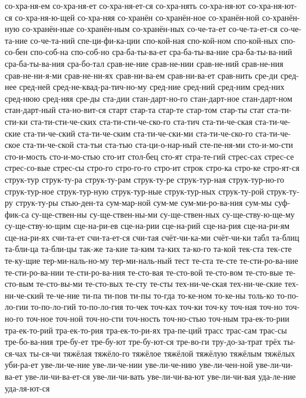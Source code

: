 {со-хра-ня-ем
со-хра-ня-ет
со-хра-ня-ет-ся
со-хра-нять
со-хра-ня-ют
со-хра-ня-ют-ся
со-хра-ня-ю-щей
со-хра-няя
со-хранён
со-хранён-ное
со-хранён-ной
со-хранён-ную
со-хранён-ные
со-хранён-ным
со-хранён-ных
со-че-та-ет
со-че-та-ет-ся
со-че-та-ние
со-че-та-ний
спе-ци-фи-ка-ции
спо-кой-ная
спо-кой-ном
спо-кой-ных
спо-со-бен
спо-соб-на
спо-соб-но
сра-ба-ты-ва-ет
сра-ба-ты-ва-ние
сра-ба-ты-ва-ний
сра-ба-ты-ва-ния
сра-бо-тал
срав-не-ние
срав-не-нии
срав-не-ний
срав-не-ния
срав-не-ни-я-ми
срав-не-ни-ях
срав-ни-ва-ем
срав-ни-ва-ет
срав-нить
сре-ди
сред-нее
сред-ней
сред-не-квад-ра-тич-но-му
сред-ние
сред-ний
сред-ним
сред-них
сред-нюю
сред-няя
сре-ды
ста-дии
стан-дарт-но-го
стан-дарт-ное
стан-дарт-ном
стан-дарт-ный
ста-но-вит-ся
старт
стар-та
стар-те
стар-том
стар-ты
стат
ста-ти-сти-ки
ста-ти-сти-че-ских
ста-ти-сти-че-ско-го
ста-тич
ста-ти-че-ская
ста-ти-че-ские
ста-ти-че-ский
ста-ти-че-ским
ста-ти-че-ски-ми
ста-ти-че-ско-го
ста-ти-че-ское
ста-ти-че-ской
ста-тьи
ста-тью
ста-ци-о-нар-ный
сте-пе-ня-ми
сто-и-мо-сти
сто-и-мость
сто-и-мо-стью
сто-ит
стол-бец
сто-ят
стра-те-гий
стрес-сах
стрес-се
стрес-со-вые
стрес-сы
стро-го
стро-го-го
стро-ит
строк
стро-ка
стро-ке
стро-ят-ся
струк-тур
струк-ту-ра
струк-ту-рам
струк-ту-ре
струк-тур-ная
струк-тур-но-го
струк-тур-ное
струк-тур-ную
струк-тур-ные
струк-тур-ных
струк-ту-рой
струк-ту-ру
струк-ту-ры
стью-ден-та
сум-мар-ной
сум-ме
сум-ми-ро-ва-ния
сум-мы
суф-фик-са
су-ще-ствен-ны
су-ще-ствен-ны-ми
су-ще-ствен-ных
су-ще-ству-ю-ще-му
су-ще-ству-ю-щим
сце-на-ри-ев
сце-на-рии
сце-на-рий
сце-на-рия
сце-на-ри-ям
сце-на-ри-ях
счи-та-ет
счи-та-ет-ся
счи-тая
счёт-чи-ка-ми
счёт-чи-ки
табл
та-блиц
та-бли-ца
та-бли-цы
так-же
та-кие
та-ким
та-ких
та-ко-го
та-кой
тек-ста
тек-сте
те-ку-щие
тер-ми-наль-но-му
тер-ми-наль-ный
тест
те-ста
те-сте
те-сти-ро-ва-ние
те-сти-ро-ва-нии
те-сти-ро-ва-ния
те-сто-вая
те-сто-вой
те-сто-вом
те-сто-вые
те-сто-вым
те-сто-вы-ми
те-сто-вых
те-сту
те-сты
тех-ни-че-ская
тех-ни-че-ские
тех-ни-че-ский
те-че-ние
ти-па
ти-пов
ти-пы
то-гда
то-ке-ном
то-ке-ны
толь-ко
то-по-ло-гии
то-по-ло-гий
то-по-ло-гия
то-чек
точ-ках
точ-ки
точ-ку
точ-ная
точ-но
точ-но-го
точ-ное
точ-ной
точ-но-сти
точ-ность
точ-но-стью
точ-ным
тра-ек-то-рии
тра-ек-то-рий
тра-ек-то-рия
тра-ек-то-ри-ях
тра-пе-ций
трасс
трас-сам
трас-сы
тре-бо-ва-ния
тре-бу-ет
тре-бу-ют
тре-бу-ют-ся
тре-во-ги
тру-до-за-трат
трёх
ты-ся-чах
ты-ся-чи
тяжёлая
тяжёло-го
тяжёлое
тяжёлой
тяжёлую
тяжёлым
тяжёлых
уби-ра-ет
уве-ли-че-ние
уве-ли-че-нии
уве-ли-че-нию
уве-ли-чен-ной
уве-ли-чи-ва-ет
уве-ли-чи-ва-ет-ся
уве-ли-чи-вать
уве-ли-чи-ва-ют
уве-ли-чи-вая
уда-ле-ние
уда-ля-ют-ся
}
